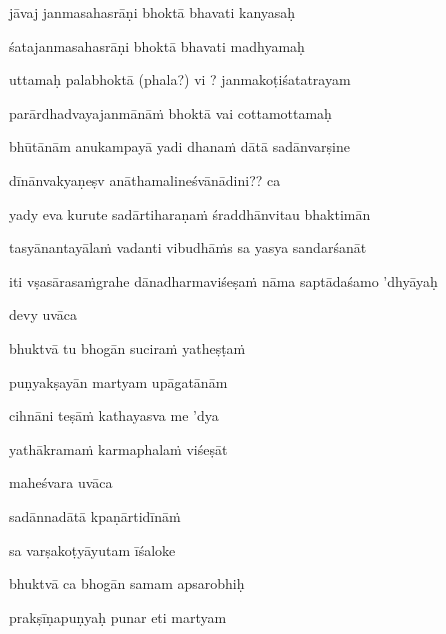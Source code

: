 jāvaj janmasahasrāṇi bhoktā bhavati kanyasaḥ\thinspace{\dandab} \dontdisplaylinenum

śatajanmasahasrāṇi bhoktā bhavati madhyamaḥ \veg\dontdisplaylinenum

uttamaḥ palabhoktā (phala?) vi ? janmakoṭiśatatrayam\thinspace{\dandab} \dontdisplaylinenum 

parārdhadvayajanmānāṁ bhoktā vai cottamottamaḥ \veg\dontdisplaylinenum

bhūtānām anukampayā yadi dhanaṁ dātā sadānvarṣine\thinspace{\dandab} \dontdisplaylinenum

dīnānvakyaṇeṣv anāthamalineśvānādini?? ca \veg\dontdisplaylinenum

yady eva kurute sadārtiharaṇaṁ śraddhānvitau bhaktimān\thinspace{\dandab} \dontdisplaylinenum

tasyānantayālaṁ vadanti vibudhāṁs sa yasya sandarśanāt \veg\dontdisplaylinenum

\vers


\jump
\begin{center}
\ketdanda iti vṣasārasaṁgrahe dānadharmaviśeṣaṁ nāma saptādaśamo 'dhyāyaḥ\ketdanda
\end{center}
\dontdisplaylinenum\vers 
\bekveg\szamveg\vfill\phpspagebreak\szam\bek{}
\thispagestyle{empty}



\jump\jump
devy uvāca~{\dandab}\dontdisplaylinenum 

\nemsloka 
bhuktvā tu bhogān suciraṁ yatheṣṭaṁ
\dontdisplaylinenum

\nemslokab 
puṇyakṣayān martyam upāgatānām \danda\dontdisplaylinenum

\nemslokac 
cihnāni teṣāṁ kathayasva me 'dya
\dontdisplaylinenum

\nemslokad 
yathākramaṁ karmaphalaṁ viśeṣāt \veg\dontdisplaylinenum

\vers

maheśvara uvāca~{\dandab}\dontdisplaylinenum 

\nemsloka 
sadānnadātā kpaṇārtidīnāṁ
\dontdisplaylinenum

\nemslokab 
sa varṣakoṭyāyutam īśaloke \danda\dontdisplaylinenum

\nemslokac 
bhuktvā ca bhogān samam apsarobhiḥ
\dontdisplaylinenum

\nemslokad 
prakṣīṇapuṇyaḥ punar eti martyam \veg\dontdisplaylinenum
{}

